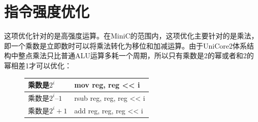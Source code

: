 \documentclass[12pt,a4paper,Flow]{report}
\begin{document}
\section{指令强度优化}
这项优化针对的是高强度运算。在MiniC的范围内，这项优化主要针对的是乘法，即一个乘数是立即数时可以将乘法转化为移位和加减运算。由于UniCore2体系结构中整点乘法只比普通ALU运算多耗一个周期，所以只有乘数是2的幂或者和2的幂相差1才可以优化：
\begin{figure}[H]
\centering
\begin{tabular}{|l|l|}
\hline
	乘数是$2^i$		& mov reg, reg << i\\
\hline
	乘数是$2^i – 1$	& rsub reg, reg, reg << i\\
\hline
	乘数是$2^i + 1$	& add reg, reg, reg << i\\
\hline
\end{tabular}
\end{figure}
\end{document}

